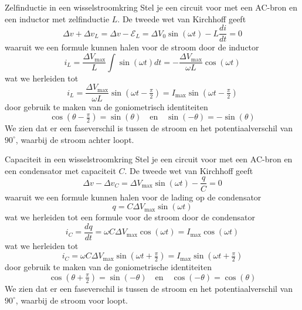 \begin{pro}{Zelfinductie in een wisselstroomkring}
    Stel je een circuit voor met een AC-bron en een inductor met zelfinductie $L$. De tweede wet van Kirchhoff geeft
    \begin{equation*}
        \Delta v + \Delta v_L = \Delta v - \mathcal{E}_{L} = \Delta V_{0}\sin(\omega t) - L\dfrac{di}{dt} = 0
    \end{equation*}
    waaruit we een formule kunnen halen voor de stroom door de inductor
    \begin{equation*}
        i_L = \dfrac{\Delta V_{\max}}{L}\int\sin(\omega t)dt = -\dfrac{\Delta V_{\max}}{\omega L}\cos(\omega t)
    \end{equation*}
    wat we herleiden tot 
    \begin{equation*}
        i_L = \dfrac{\Delta V_{\max}}{\omega L}\sin(\omega t - \tfrac{\pi}{2}) = I_{\max}\sin(\omega t - \tfrac{\pi}{2})
    \end{equation*}
    door gebruik te maken van de goniometrisch identiteiten 
    \begin{equation*}
        \cos(\theta - \tfrac{\pi}{2}) = \sin(\theta) \quad \text{en} \quad \sin(-\theta) = -\sin(\theta) 
    \end{equation*}
    We zien dat er een faseverschil is tussen de stroom en het potentiaalverschil van $90^{\circ}$, waarbij de stroom achter loopt.
\end{pro}

\begin{pro}{Capaciteit in een wisselstroomkring}
    Stel je een circuit voor met een AC-bron en een condensator met capaciteit $C$. De tweede wet van Kirchhoff geeft
    \begin{equation*}
        \Delta v - \Delta v_{C} = \Delta V_{\max}\sin(\omega t) - \dfrac{q}{C} = 0
    \end{equation*}
    waaruit we een formule kunnen halen voor de lading op de condensator
    \begin{equation*}
        q = C\Delta V_{\max}\sin(\omega t)
    \end{equation*}
    wat we herleiden tot een formule voor de stroom door de condensator
    \begin{equation*}
        i_C = \dfrac{dq}{dt} = \omega C\Delta V_{\max}\cos(\omega t) = I_{\max}\cos(\omega t)
    \end{equation*}
    wat we herleiden tot
    \begin{equation*}
        i_C = \omega C\Delta V_{\max}\sin(\omega t + \tfrac{\pi}{2}) = I_{\max}\sin(\omega t + \tfrac{\pi}{2})
    \end{equation*}
    door gebruik te maken van de goniometrische identiteiten
    \begin{equation*}
        \cos(\theta + \tfrac{\pi}{2}) = \sin(-\theta) \quad \text{en} \quad \cos(-\theta) = \cos(\theta)
    \end{equation*}
    We zien dat er een faseverschil is tussen de stroom en het potentiaalverschil van $90^{\circ}$, waarbij de stroom voor loopt.
\end{pro}

